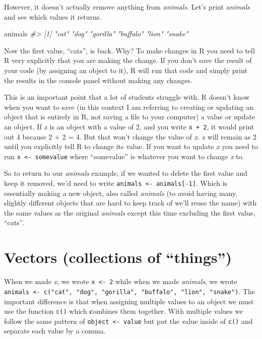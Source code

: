 \documentclass[
  12pt,
]{book}
\newenvironment{Shaded}{\begin{snugshade}}{\end{snugshade}}
\newcommand{\CommentTok}[1]{\textcolor[rgb]{0.37,0.37,0.37}{\textit{#1}}}
\newcommand{\NormalTok}[1]{#1}
\begin{document}
However, it doesn't actually remove anything from \emph{animals}. Let's print \emph{animals} and see which values it returns.

\begin{Shaded}
\begin{Highlighting}[]
\NormalTok{animals}
\CommentTok{\#> [1] "cat"     "dog"     "gorilla" "buffalo" "lion"    "snake"}
\end{Highlighting}
\end{Shaded}

Now the first value, ``cats'', is back. Why? To make changes in R you need to tell R very explicitly that you are making the change. If you don't save the result of your code (by assigning an object to it), R will run that code and simply print the results in the console panel without making any changes.

This is an important point that a lot of students struggle with. R doesn't know when you want to save (in this context I am referring to creating or updating an object that is entirely in R, not saving a file to your computer) a value or update an object. If \emph{x} is an object with a value of 2, and you write \texttt{x\ +\ 2}, it would print out 4 because 2 + 2 = 4. But that won't change the value of \emph{x}. \emph{x} will remain as 2 until you explicitly tell R to change its value. If you want to update \emph{x} you need to run \texttt{x\ \textless{}-\ somevalue} where ``somevalue'' is whatever you want to change \emph{x} to.

So to return to our \emph{animals} example, if we wanted to delete the first value and keep it removed, we'd need to write \texttt{animals\ \textless{}-\ animals{[}-1{]}}. Which is essentially making a new object, also called \emph{animals} (to avoid having many, slightly different objects that are hard to keep track of we'll reuse the name) with the same values as the original \emph{animals} except this time excluding the first value, ``cats''.

\hypertarget{vectors}{%
\section{Vectors (collections of ``things'')}\label{vectors}}

When we made \emph{x}, we wrote \texttt{x\ \textless{}-\ 2} while when we made \emph{animals}, we wrote \texttt{animals\ \textless{}-\ c("cat",\ "dog",\ "gorilla",\ "buffalo",\ "lion",\ "snake")}. The important difference is that when assigning multiple values to an object we must use the function \texttt{c()} which \textbf{c}ombines them together. With multiple values we follow the same pattern of \texttt{object\ \textless{}-\ value} but put the value inside of \texttt{c()} and separate each value by a comma.
\end{document}
